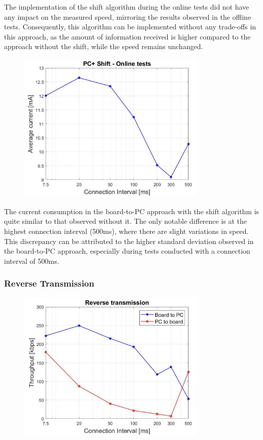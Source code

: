 \documentclass{Configuration_Files/PoliMi3i_thesis}
\begin{document}
The implementation of the shift algorithm during the online tests did not have any impact on the measured speed, mirroring the results observed in the offline tests. Consequently, this algorithm can be implemented without any trade-offs in this approach, as the amount of information received is higher compared to the approach without the shift, while the speed remains unchanged.

\begin{figure}[H]
    \centering
    \includegraphics[width=0.8\textwidth]{Results Manuel/figure38}
    \label{fig:figure1}
\end{figure}

The current consumption in the board-to-PC approach with the shift algorithm is quite similar to that observed without it. The only notable difference is at the highest connection interval (500ms), where there are slight variations in speed. This discrepancy can be attributed to the higher standard deviation observed in the board-to-PC approach, especially during tests conducted with a connection interval of 500ms.

\subsubsection*{Reverse Transmission}

\begin{figure}[H]
    \centering
    \includegraphics[width=0.8\textwidth]{Results Manuel/figure39}
    \label{fig:figure1}
\end{figure}
\end{document}

